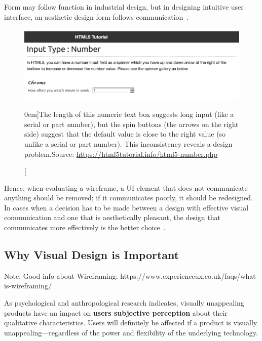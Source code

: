 Form may follow function in industrial design, but in designing intuitive user interface, an aesthetic design form follows communication~\citep{mckay:2013}.

\begin{figure}%
	\centering
  \includegraphics[width=1.0\textwidth]{../figures/inconsistent_inputfield.png}
  \caption[][0em]{The length of this numeric text box suggests long input (like a serial or part number), but the spin buttons (the arrows on the right side) suggest that the default value is close to the right value (so unlike a serial or part number). This inconsistency reveals a design problem.\newline Source: \url{https://html5tutorial.info/html5-number.php}}
  \label{fig:inconsistent_inputfield}
\end{figure}

Hence, when evaluating a wireframe, a UI element that does not communicate anything should be removed; if it communicates poorly, it should be redesigned. In cases when a decision has to be made between a design with effective visual communication and one that is aesthetically pleasant, the design that communicates more effectively is the better choice~\citep{mckay:2013}. 


\subsection{Why Visual Design is Important} %
\label{sub:why_visual_design_is_important}

Note: Good info about Wireframing: https://www.experienceux.co.uk/faqs/what-is-wireframing/

As psychological and anthropological research indicates, visually unappealing products have an impact on \textbf{users subjective perception} about their qualitative characteristics. 
Users will definitely be affected if a product is visually unappealing---regardless of the power and flexibility of the underlying technology. 


